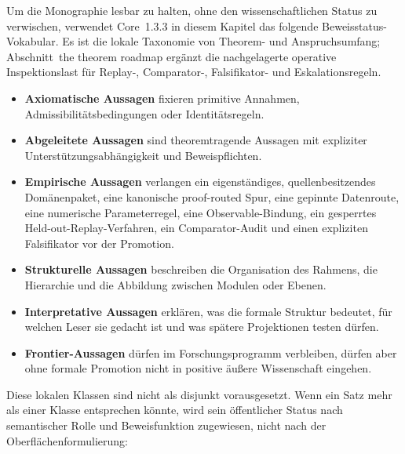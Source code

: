 Um die Monographie lesbar zu halten, ohne den wissenschaftlichen Status zu
verwischen, verwendet Core~1.3.3 in diesem Kapitel das folgende
Beweisstatus-Vokabular. Es ist die lokale Taxonomie von Theorem- und
Anspruchsumfang; Abschnitt~the theorem roadmap ergänzt die
nachgelagerte operative Inspektionslast für Replay-, Comparator-, Falsifikator-
und Eskalationsregeln.

\begin{itemize}
\item \textbf{Axiomatische Aussagen} fixieren primitive Annahmen,
      Admissibilitätsbedingungen oder Identitätsregeln.
\item \textbf{Abgeleitete Aussagen} sind theoremtragende Aussagen mit expliziter
      Unterstützungsabhängigkeit und Beweispflichten.
\item \textbf{Empirische Aussagen} verlangen ein eigenständiges,
      quellenbesitzendes Domänenpaket, eine kanonische proof-routed Spur,
      eine gepinnte Datenroute, eine numerische Parameterregel, eine
      Observable-Bindung, ein gesperrtes Held-out-Replay-Verfahren, ein
      Comparator-Audit und einen expliziten Falsifikator vor der Promotion.
\item \textbf{Strukturelle Aussagen} beschreiben die Organisation des Rahmens,
      die Hierarchie und die Abbildung zwischen Modulen oder Ebenen.
\item \textbf{Interpretative Aussagen} erklären, was die formale Struktur
      bedeutet, für welchen Leser sie gedacht ist und was spätere Projektionen
      testen dürfen.
\item \textbf{Frontier-Aussagen} dürfen im Forschungsprogramm verbleiben,
      dürfen aber ohne formale Promotion nicht in positive äußere Wissenschaft
      eingehen.
\end{itemize}
Diese lokalen Klassen sind nicht als disjunkt vorausgesetzt. Wenn ein Satz
mehr als einer Klasse entsprechen könnte, wird sein öffentlicher Status nach
semantischer Rolle und Beweisfunktion zugewiesen, nicht nach der
Oberflächenformulierung:
